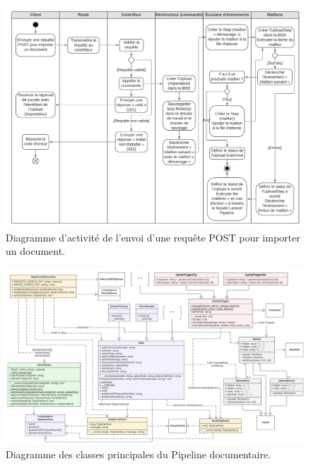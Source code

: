 \begin{figure}
    \centering
    \includegraphics[width=\textwidth]{img/import-activity-diagram}
    \caption{Diagramme d'activité de l'envoi d'une requête POST pour importer un document.}
    \label{fig:import-activity-diagram}
\end{figure}

\begin{figure}
    \centering
    \includegraphics[width=\textwidth]{img/class-diagram-2}
    \caption{Diagramme des classes principales du Pipeline documentaire.}
    \label{fig:class-diagram}
\end{figure}

